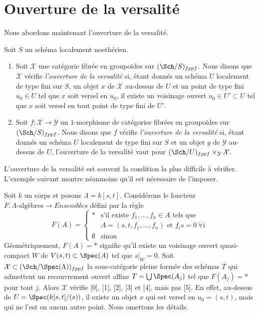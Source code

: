 \section{Ouverture de la versalité}
\label{section-openness-versality}

\noindent
Nous abordons maintenant l'ouverture de la versalité.

\begin{definition}
\label{definition-openness-versality}
Soit $S$ un schéma localement noethérien.
\begin{enumerate}
\item Soit $\mathcal{X}$ une catégorie
fibrée en groupoïdes sur $(\Sch/S)_{fppf}$. Nous disons que $\mathcal{X}$ vérifie
{\it l'ouverture de la versalité} si, étant donnés un schéma $U$ localement de type fini
sur $S$, un objet $x$ de $\mathcal{X}$ au-dessus de $U$ et un point de type fini
$u_0 \in U$ tel que $x$ soit versel en $u_0$, il existe un voisinage ouvert
$u_0 \in U' \subset U$ tel que $x$ soit versel en tout point de type fini
de $U'$.
\item Soit $f : \mathcal{X} \to \mathcal{Y}$ un $1$-morphisme de catégories
fibrées en groupoïdes sur $(\Sch/S)_{fppf}$. Nous disons que $f$ vérifie
{\it l'ouverture de la versalité} si, étant donnés un schéma $U$ localement de type fini
sur $S$ et un objet $y$ de $\mathcal{Y}$ au-dessus de $U$, l'ouverture
de la versalité vaut pour
$(\Sch/U)_{fppf} \times_\mathcal{Y} \mathcal{X}$.
\end{enumerate}
\end{definition}

\noindent
L'ouverture de la versalité est souvent la condition la plus difficile à vérifier. L'exemple suivant
montre néanmoins qu'il est nécessaire de l'imposer.

\begin{example}
\label{example-versality}
Soit $k$ un corps et posons $\Lambda = k[s, t]$. Considérons le foncteur
$F : \Lambda\text{-algèbres} \longrightarrow \textit{Ensembles}$
défini par la règle
$$
F(A) =
\left\{
\begin{matrix}
* & \text{s'il existe }f_1, \ldots, f_n \in A\text{ tels que } \\
  & A = (s, t, f_1, \ldots, f_n)\text{ et } f_i s = 0\ \forall i \\
\emptyset & \text{sinon}
\end{matrix}
\right.
$$
Géométriquement, $F(A) = *$ signifie qu'il existe un voisinage ouvert quasi-compact
$W$ de $V(s, t) \subset \Spec(A)$ tel que $s|_W = 0$.
Soit $\mathcal{X} \subset (\Sch/\Spec(\Lambda))_{fppf}$ la sous-catégorie pleine
formée des schémas $T$ qui admettent un recouvrement ouvert affine
$T = \bigcup \Spec(A_j)$ tel que $F(A_j) = *$ pour tout $j$. Alors $\mathcal{X}$
vérifie [0], [1], [2], [3] et [4], mais pas [5]. En effet, au-dessus de
$U = \Spec(k[s, t]/(s))$,
il existe un objet $x$ qui est versel en $u_0 = (s, t)$, mais qui ne l'est
en aucun autre point. Nous omettons les détails.
\end{example}

